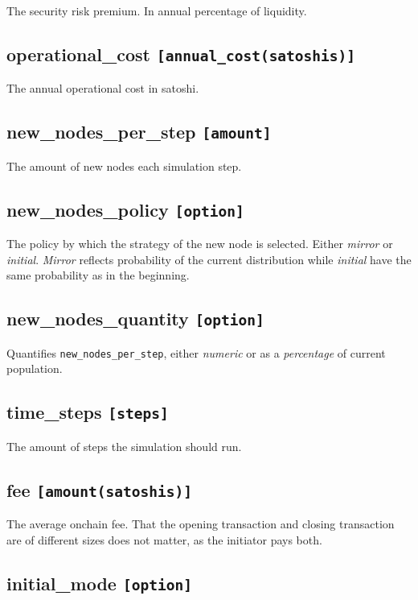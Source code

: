 The security risk premium. In annual percentage of liquidity.

\subsection*{operational\_cost \texttt{[annual\_cost(satoshis)]}}

The annual operational cost in satoshi.

\subsection*{new\_nodes\_per\_step \texttt{[amount]}}

The amount of new nodes each simulation step. 

\subsection*{new\_nodes\_policy \texttt{[option]}}

The policy by which the strategy of the new node is selected. Either \textit{mirror} or \textit{initial}. \textit{Mirror} reflects probability of the current distribution while \textit{initial} have the same probability as in the beginning.

\subsection*{new\_nodes\_quantity \texttt{[option]}}

Quantifies \texttt{new\_nodes\_per\_step}, either \textit{numeric} or as a \textit{percentage} of current population.

\subsection*{time\_steps \texttt{[steps]}}

The amount of steps the simulation should run. 

\subsection*{fee \texttt{[amount(satoshis)]}}

The average onchain fee. That the opening transaction and closing transaction are of different sizes does not matter, as the initiator pays both.

\subsection*{initial\_mode \texttt{[option]}}

